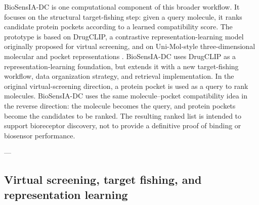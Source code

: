 

BioSensIA-DC is one computational component of this broader workflow.
It focuses on the structural target-fishing step: given a query
molecule, it ranks candidate protein pockets according to a learned
compatibility score. The prototype is based on DrugCLIP, a contrastive
representation-learning model originally proposed for virtual
screening, and on Uni-Mol-style three-dimensional molecular and pocket
representations \citep{gao23:_drugc,zhou23:_uni_mol}. BioSensIA-DC
uses DrugCLIP as a representation-learning foundation, but extends it
with a new target-fishing workflow, data organization strategy, and
retrieval implementation. In the original
virtual-screening direction, a protein pocket is used as a query to
rank molecules. BioSensIA-DC uses the same molecule--pocket
compatibility idea in the reverse direction: the molecule becomes the
query, and protein pockets become the candidates to be ranked. The
resulting ranked list is intended to support bioreceptor discovery,
not to provide a definitive proof of binding or biosensor performance.


---

\subsection{Virtual screening, target fishing, and representation learning}

